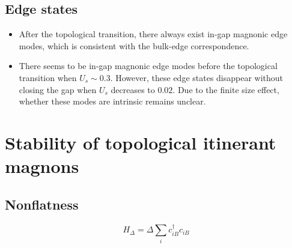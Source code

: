 \documentclass[a0,portrait]{a0poster}
\newcommand\myfigure[6]{%
  \ifdim#2>.8\linewidth
    {%
      \centering
      \texttt{[image: \#4]}%
      \captionof{figure}{#5}%
      \label{#6}%
    }%
  \else
  \begin{figure}
    \texttt{[image: \#4]}
    \caption{#5}
    \label{#6}%
  \end{figure}
  \fi
}
\begin{document}
\begin{multicols}{2}
\begin{multicols}{2}
\end{multicols}

\subsection*{Edge states}

\begin{multicols}{2}

\myfigure{R}{1.0\linewidth}{\linewidth}{edge.pdf}{At the top: (a) Magnon spectrum of Eq. (\ref{model}) subject to open boundary conditions. At the bottom: Difference of the $S_z$ profile between the in-gap or near-gap magnon states and ground state with (b) $U_s=0.02$, (c) $U_s=0.30$ and (d) $U_s=0.78$. Other parameters are fixed at $t=1.0$, $\lambda=1.4$, $U_d=1.0$.}{edge}

\begin{itemize}
  \item After the topological transition, there always exist in-gap magnonic edge modes, which is consistent with the bulk-edge correspondence.
  \item There seems to be in-gap magnonic edge modes before the topological transition when $U_s\sim0.3$. However, these edge states disappear without closing the gap when $U_s$ decreases to $0.02$. Due to the finite size effect, whether these modes are intrinsic remains unclear.
\end{itemize}

\end{multicols}


\section*{Stability of topological itinerant magnons}

\begin{multicols}{2}
\subsection*{Nonflatness}

\begin{equation}\label{delta}
H_{\Delta}=\Delta\sum_ic_{iB}^\dagger c_{iB}
\end{equation}

\myfigure{R}{1.0\linewidth}{\linewidth}{delta_spectrum.pdf}{(a)-(d) Spin-1 excitation spectra calculated by PED with $N_q=800$ of Eq. (\ref{model}) perturbed by Eq. (\ref{delta}) with (a) $U_s=0.30$, $\Delta=0$, (b) $U_s=0.30$, $\Delta=0.22$, (c) $U_s=0.30$, $\Delta=0.30$, (d) $U_s=0.30$, $\Delta=0.45$. The shaded area represents the Stoner continuum. Insets of (a)-(d) show the corresponding perturbed free electron bands. (e) The phase diagram in the $\Delta$-$U_s$ parameter space. NFM, FM and TFM represent nonferromagnetic phase, ferromagnetic magnons and topological ferromagnetic magnons, respectively. Red stars mark the parameters used in (a)-(d). Other parameters are fixed at $t=1.0$, $\lambda=1.4$, $U_d=1.0$.}{dspectrum}


\end{multicols}
\end{multicols}
\end{document}
